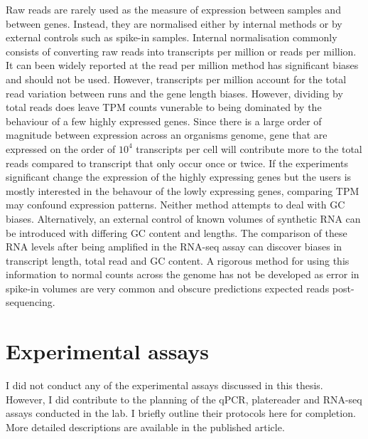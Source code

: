 \documentclass{SBCbookchapter}
\begin{document}
Raw reads are rarely used as the measure of expression between samples and between genes. Instead, they are normalised either by internal methods or by external controls such as spike-in samples. Internal normalisation commonly consists of converting raw reads into transcripts per million or reads per million. It can been widely reported at the read per million method has significant biases and should not be used. However, transcripts per million account for the total read variation between runs and the gene length biases. However, dividing by total reads does leave TPM counts vunerable to being dominated by the behaviour of a few highly expressed genes. Since there is a large order of magnitude between expression across an organisms genome, gene that are expressed on the order of $10^4$ transcripts per cell will contribute more to the total reads compared to transcript that only occur once or twice. If the experiments significant change the expression of the highly expressing genes but the users is mostly interested in the behavour of the lowly expressing genes, comparing TPM may confound expression patterns. Neither method attempts to deal with GC biases. Alternatively, an external control of known volumes of synthetic RNA can be introduced with differing GC content and lengths. The comparison of these RNA levels after being amplified in the RNA-seq assay can discover biases in transcript length, total read and GC content. A rigorous method for using this information to normal counts across the genome has not be developed as error in spike-in volumes are very common and obscure predictions expected reads post-sequencing.

\section{Experimental assays}
I did not conduct any of the experimental assays discussed in this thesis. However, I did contribute to the planning of the qPCR, platereader and RNA-seq assays conducted in the lab. I briefly outline their protocols here for completion. More detailed descriptions are available in the published article.



\end{document}
